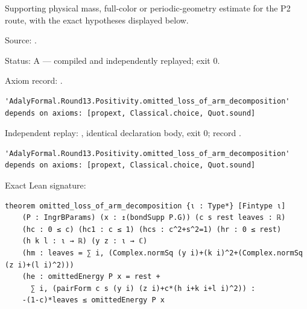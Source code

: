 \begin{theorem}[bp-459]
\label{bp-459}
\leanok
Supporting physical mass, full-color or periodic-geometry estimate for the P2 route, with the exact hypotheses displayed below.

\par Source: \texttt{}.
\par Status: A — compiled and independently replayed; exit 0.
\par Axiom record: \texttt{}.
\begin{verbatim}
'AdalyFormal.Round13.Positivity.omitted_loss_of_arm_decomposition' depends on axioms: [propext, Classical.choice, Quot.sound]
\end{verbatim}
\par Independent replay: \texttt{}, identical declaration body, exit 0; record \texttt{}.
\begin{verbatim}
'AdalyFormal.Round13.Positivity.omitted_loss_of_arm_decomposition' depends on axioms: [propext, Classical.choice, Quot.sound]
\end{verbatim}
\par Exact Lean signature:
\begin{verbatim}
theorem omitted_loss_of_arm_decomposition {ι : Type*} [Fintype ι]
    (P : IngrBParams) (x : ↥(bondSupp P.G)) (c s rest leaves : ℝ)
    (hc : 0 ≤ c) (hc1 : c ≤ 1) (hcs : c^2+s^2=1) (hr : 0 ≤ rest)
    (h k l : ι → ℝ) (y z : ι → ℂ)
    (hm : leaves = ∑ i, (Complex.normSq (y i)+(k i)^2+(Complex.normSq (z i)+(l i)^2)))
    (he : omittedEnergy P x = rest +
      ∑ i, (pairForm c s (y i) (z i)+c*(h i+k i+l i)^2)) :
    -(1-c)*leaves ≤ omittedEnergy P x
\end{verbatim}
\end{theorem}


